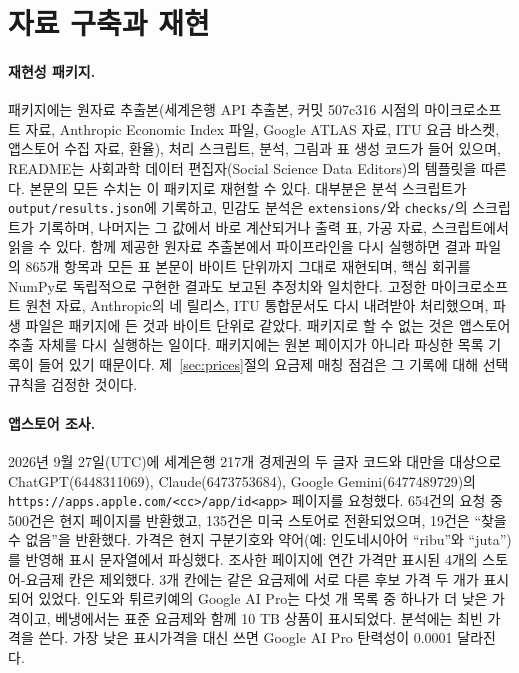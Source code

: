 \documentclass[11pt]{article}
\theoremstyle{definition}
\theoremstyle{remark}
\begin{document}
\section{자료 구축과 재현}\label{app:data}

\paragraph{재현성 패키지.} 패키지에는 원자료 추출본(세계은행 API 추출본, 커밋 507c316 시점의 마이크로소프트 자료, Anthropic Economic Index 파일, Google ATLAS 자료, ITU 요금 바스켓, 앱스토어 수집 자료, 환율), 처리 스크립트, 분석, 그림과 표 생성 코드가 들어 있으며, README는 사회과학 데이터 편집자(Social Science Data Editors)의 템플릿을 따른다. 본문의 모든 수치는 이 패키지로 재현할 수 있다. 대부분은 분석 스크립트가 \nolinkurl{output/results.json}에 기록하고, 민감도 분석은 \nolinkurl{extensions/}와 \nolinkurl{checks/}의 스크립트가 기록하며, 나머지는 그 값에서 바로 계산되거나 출력 표, 가공 자료, 스크립트에서 읽을 수 있다. 함께 제공한 원자료 추출본에서 파이프라인을 다시 실행하면 결과 파일의 865개 항목과 모든 표 본문이 바이트 단위까지 그대로 재현되며, 핵심 회귀를 NumPy로 독립적으로 구현한 결과도 보고된 추정치와 일치한다. 고정한 마이크로소프트 원천 자료, Anthropic의 네 릴리스, ITU 통합문서도 다시 내려받아 처리했으며, 파생 파일은 패키지에 든 것과 바이트 단위로 같았다. 패키지로 할 수 없는 것은 앱스토어 추출 자체를 다시 실행하는 일이다. 패키지에는 원본 페이지가 아니라 파싱한 목록 기록이 들어 있기 때문이다. 제~\ref{sec:prices}절의 요금제 매칭 점검은 그 기록에 대해 선택 규칙을 검정한 것이다.

\paragraph{앱스토어 조사.} 2026년 9월 27일(UTC)에 세계은행 217개 경제권의 두 글자 코드와 대만을 대상으로 ChatGPT(6448311069), Claude(6473753684), Google Gemini(6477489729)의 \nolinkurl{https://apps.apple.com/<cc>/app/id<app>} 페이지를 요청했다. 654건의 요청 중 500건은 현지 페이지를 반환했고, 135건은 미국 스토어로 전환되었으며, 19건은 ``찾을 수 없음''을 반환했다. 가격은 현지 구분기호와 약어(예: 인도네시아어 ``ribu''와 ``juta'')를 반영해 표시 문자열에서 파싱했다. 조사한 페이지에 연간 가격만 표시된 4개의 스토어-요금제 칸은 제외했다. 3개 칸에는 같은 요금제에 서로 다른 후보 가격 두 개가 표시되어 있었다. 인도와 튀르키예의 Google AI Pro는 다섯 개 목록 중 하나가 더 낮은 가격이고, 베냉에서는 표준 요금제와 함께 10 TB 상품이 표시되었다. 분석에는 최빈 가격을 쓴다. 가장 낮은 표시가격을 대신 쓰면 Google AI Pro 탄력성이 0.0001 달라진다.
\end{document}
